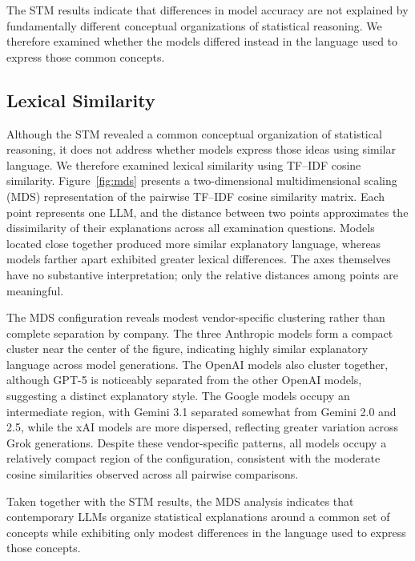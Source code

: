 \documentclass[APA,LATO2COL]{WileyNJDv5}
\begin{document}
The STM results indicate that differences in model accuracy are not explained by fundamentally different conceptual organizations of statistical reasoning. We therefore examined whether the models differed instead in the language used to express those common concepts.

\subsection{Lexical Similarity}\label{sec:lexsim}

Although the STM revealed a common conceptual organization of statistical reasoning, it does not address whether models express those ideas using similar language. We therefore examined lexical similarity using TF–IDF cosine similarity. Figure~\ref{fig:mds} presents a two-dimensional multidimensional scaling (MDS) representation of the pairwise TF--IDF cosine similarity matrix. Each point represents one LLM, and the distance between two points approximates the dissimilarity of their explanations across all examination questions. Models located close together produced more similar explanatory language, whereas models farther apart exhibited greater lexical differences. The axes themselves have no substantive interpretation; only the relative distances among points are meaningful.

The MDS configuration reveals modest vendor-specific clustering rather than complete separation by company. The three Anthropic models form a compact cluster near the center of the figure, indicating highly similar explanatory language across model generations. The OpenAI models also cluster together, although GPT-5 is noticeably separated from the other OpenAI models, suggesting a distinct explanatory style. The Google models occupy an intermediate region, with Gemini 3.1 separated somewhat from Gemini 2.0 and 2.5, while the xAI models are more dispersed, reflecting greater variation across Grok generations. Despite these vendor-specific patterns, all models occupy a relatively compact region of the configuration, consistent with the moderate cosine similarities observed across all pairwise comparisons.

Taken together with the STM results, the MDS analysis indicates that contemporary LLMs organize statistical explanations around a common set of concepts while exhibiting only modest differences in the language used to express those concepts.
\end{document}
